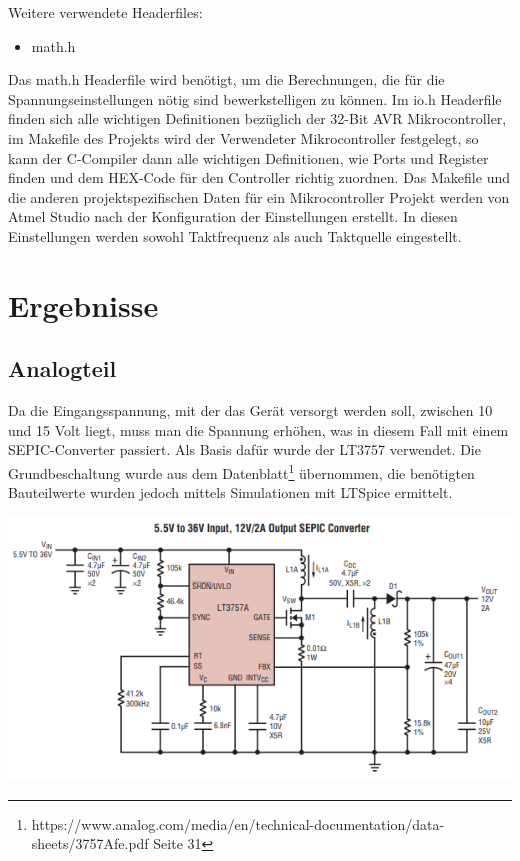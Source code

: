 \documentclass[paper=a4, 12pt]{scrreprt}
\begin{document}
	Weitere verwendete Headerfiles:
	\begin{itemize}
		\item math.h
	\end{itemize}
	Das math.h Headerfile wird benötigt, um die Berechnungen, die für die Spannungseinstellungen nötig sind bewerkstelligen zu können. \hfill \break
	Im io.h Headerfile finden sich alle wichtigen Definitionen bezüglich der 32-Bit AVR Mikrocontroller, im Makefile des Projekts wird der Verwendeter Mikrocontroller festgelegt, so kann der C-Compiler dann alle wichtigen Definitionen, wie Ports und Register finden und dem HEX-Code für den Controller richtig zuordnen. \hfill \break
	Das Makefile und die anderen projektspezifischen Daten für ein Mikrocontroller Projekt werden von Atmel Studio nach der Konfiguration der Einstellungen erstellt. In diesen Einstellungen werden sowohl Taktfrequenz als auch Taktquelle eingestellt.
	\newpage
	
		
\chapter{Ergebnisse}\hfill \break
	\section{Analogteil}\hfill \break
	Da die Eingangsspannung, mit der das Gerät versorgt werden soll, zwischen 10 und 15 Volt liegt, muss man die Spannung erhöhen, was in diesem Fall mit einem SEPIC-Converter passiert. Als Basis dafür wurde der LT3757 verwendet.\hfill \break
	Die Grundbeschaltung wurde aus dem Datenblatt\footnote{https://www.analog.com/media/en/technical-documentation/data-sheets/3757Afe.pdf Seite 31} übernommen, die benötigten Bauteilwerte wurden jedoch mittels Simulationen mit LTSpice ermittelt.
	\begin{adjustbox}{center,caption={Referenzschaltung für SEPIC}, label={fig:LTSpice-Schaltung-Analogteil},nofloat=figure,vspace=\bigskipamount}
		\includegraphics[height=7cm]{img/Referenzschaltung_SEPIC.PNG}
	\end{adjustbox}
	\newpage
	
\end{document}
